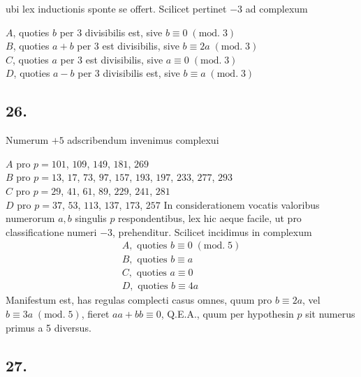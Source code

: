 \documentclass[twoside,12pt]{memoir}
\renewenvironment{quote}%
  {\list{}{\leftmargin=5em\rightmargin=0em}\item[]}%
  {\endlist}
\renewcommand{\pmod}[1]{\;(\textrm{mod.}\;#1)}
\begin{document}
ubi lex inductionis sponte se offert. Scilicet pertinet \(-3\) ad complexum
\begin{quote}\(A\), quoties \(b\) per 3 divisibilis est, sive \(b \equiv 0\pmod{3}\)\\
\(B\), quoties \(a+b\) per 3 est divisibilis, sive \(b \equiv 2 a\pmod{3}\)\\
\(C\), quoties \(a\) per 3 est divisibilis, sive \(a \equiv 0\pmod{3}\)\\
\(D\), quoties \(a-b\) per 3 divisibilis est, sive \(b \equiv a\pmod{3}\)\end{quote}

\subsection*{26.}
 
Numerum \(+5\) adscribendum invenimus complexui
\begin{quote}
\(A\) pro \(p=101\), \(109\), \(149\), \(181\), \(269\) \\
\(B\) pro \(p=13\), \(17\), \(73\), \(97\), \(157\), \(193\), \(197\), \(233\), \(277\), \(293\) \\
\(C\) pro \(p=29\), \(41\), \(61\), \(89\), \(229\), \(241\), \(281\) \\
\(D\) pro \(p=37\), \(53\), \(113\), \(137\), \(173\), \(257\)\end{quote}
In considerationem vocatis valoribus numerorum \(a, b\) singulis \(p\) respondentibus, lex hic aeque facile, ut pro classificatione numeri \(-3\), prehenditur. Scilicet incidimus in complexum\pagebreak%
\[\begin{array}{l}
A, \text{ quoties } b \equiv 0\pmod{5} \\
B, \text{ quoties } b \equiv a \\
C, \text{ quoties } a \equiv 0 \\
D, \text{ quoties } b \equiv 4 a
\end{array}\]
Manifestum est, has regulas complecti casus omnes, quum pro \(b \equiv 2 a\), vel \(b \equiv 3 a\pmod{5}\), fieret \(a a+b b \equiv 0\), Q.E.A., quum per hypothesin \(p\) sit numerus primus a 5 diversus.

\subsection*{27.}
 
\end{document}
